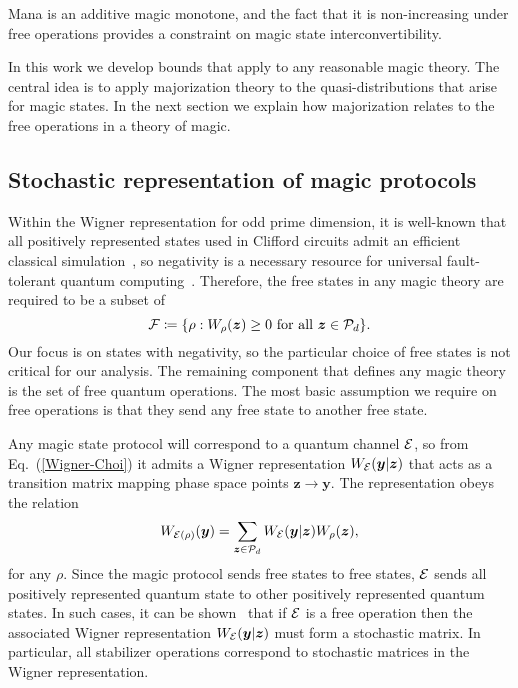 \documentclass[
onecolumn,
superscriptaddress
]{revtex4-1}
\def\y{\boldsymbol{y}}
\def\z{\boldsymbol{z}}
\def\E{{\cal E}}
\def\F{{\cal F}}
\renewcommand{\P}{{\cal P}}
\begin{document}
Mana is an additive magic monotone, and the fact that it is non-increasing under free operations provides a constraint on magic state interconvertibility.

In this work we develop bounds that apply to any reasonable magic theory. The central idea is to apply majorization theory to the quasi-distributions that arise for magic states. In the next section we explain how majorization relates to the free operations in a theory of magic.


\subsection*{Stochastic representation of magic protocols}

Within the Wigner representation for odd prime dimension, it is well-known that all positively represented states used in Clifford circuits admit an efficient classical simulation~\cite{cit:mari}, so negativity is a necessary resource for universal fault-tolerant quantum computing~\cite{cit:veitch}. Therefore, the free states in any magic theory are required to be a subset of
\begin{equation}
    \F \coloneqq \{ \rho: W_\rho(\z) \geq 0 \text{ for all } \z \in \P_d\}.
\end{equation}
Our focus is on states with negativity, so the particular choice of free states is not critical for our analysis. The remaining component that defines any magic theory is the set of free quantum operations. The most basic assumption we require on free operations is that they send any free state to another free state.

Any magic state protocol will correspond to a quantum channel $\E$, so from Eq.~(\ref{Wigner-Choi}) it admits a Wigner representation $W_{\E}(\y | \z)$ that acts as a transition matrix mapping phase space points $\z \rightarrow \y$. The representation obeys the relation 
\begin{equation}
	W_{\E(\rho)} (\y) = \sum_{\z \in \P_d} W_{\E}( \y | \z) W_\rho(\z),
\end{equation}
for any $\rho$. Since the magic protocol sends free states to free states, $\E$ sends all positively represented quantum state to other positively represented quantum states. In such cases, it can be shown~\cite{Wang_2019} that if $\E$ is a free operation then the associated Wigner representation $W_{\E}(\y |\z)$ must form a stochastic matrix. In particular, all stabilizer operations correspond to stochastic matrices in the Wigner representation. 
\end{document}
